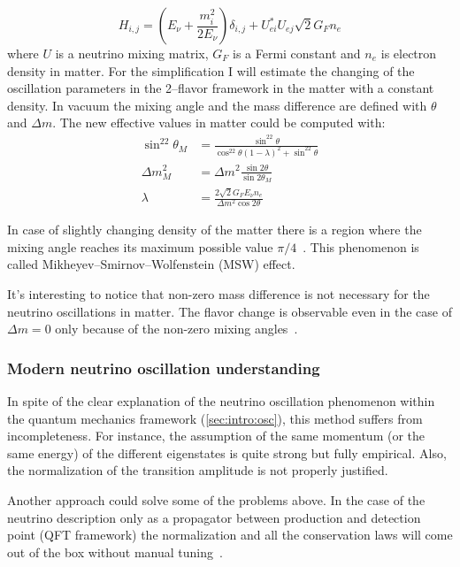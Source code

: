 \documentclass[../main.tex]{subfiles}
\begin{document}
\begin{equation}
H_{i,j}=\left(E_\nu+\frac{m_i^2}{2E_\nu}\right)\delta_{i,j}+U_{ei}^*U_{ej}\sqrt2G_Fn_e
\end{equation}
where $U$ is a neutrino mixing matrix, $G_F$ is a Fermi constant and $n_e$ is electron density in matter. For the simplification I will estimate the changing of the oscillation parameters in the 2--flavor framework in the matter with a constant density. In vacuum the mixing angle and the mass difference are defined with $\theta$ and $\Delta m$. The new effective values in matter could be computed with:
\begin{align}
\sin^22\theta_M&=\frac{\sin^22\theta}{\cos^22\theta(1-\lambda)^2+\sin^22\theta} \\
\Delta m^2_M&=\Delta m^2\frac{\sin2\theta}{\sin2\theta_M} \\
\lambda&=\frac{2\sqrt2G_FE_\nu n_e}{\Delta m^2\cos2\theta}
\end{align}

In case of slightly changing density of the matter there is a region where the mixing angle reaches its maximum possible value $\pi/4$~\cite{Mikheyev1985}. This phenomenon is called Mikheyev–Smirnov–Wolfenstein (MSW) effect.

It's interesting to notice that non-zero mass difference is not necessary for the neutrino oscillations in matter. The flavor change is observable even in the case of $\Delta m=0$ only because of the non-zero mixing angles~\cite{Smirnov2016}.


\subsubsection{Modern neutrino oscillation understanding}
In spite of the clear explanation of the neutrino oscillation phenomenon within the quantum mechanics framework (\autoref{sec:intro:osc}), this method suffers from incompleteness. For instance, the assumption of the same momentum (or the same energy) of the different eigenstates is quite strong but fully empirical. Also, the normalization of the transition amplitude is not properly justified.

Another approach could solve some of the problems above. In the case of the neutrino description only as a propagator between production and detection point (QFT framework) the normalization and all the conservation laws will come out of the box without manual tuning~\cite{Akhmedov2010a}.
\end{document}
